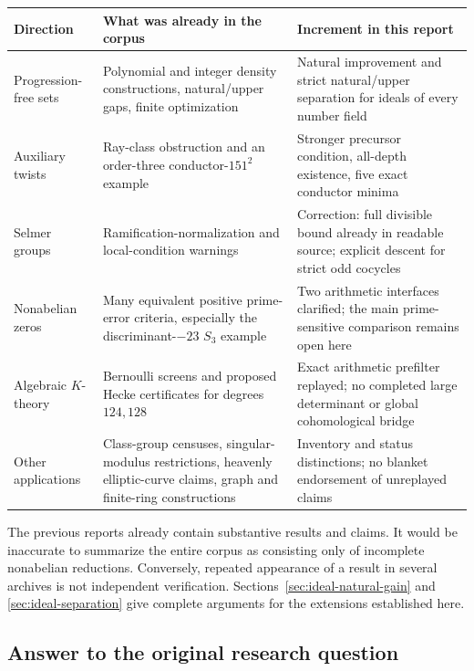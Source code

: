 \begin{center}\small
\begin{tabularx}{\textwidth}{@{}>{\raggedright\arraybackslash}p{}YY@{}}
\toprule
Direction & What was already in the corpus & Increment in this report\\
\midrule
Progression-free sets & Polynomial and integer density constructions,
natural/upper gaps, finite optimization & Natural improvement and
strict natural/upper separation for ideals of every number field\\
Auxiliary twists & Ray-class obstruction and an order-three
conductor-$151^2$ example & Stronger precursor condition, all-depth
existence, five exact conductor minima\\
Selmer groups & Ramification-normalization and local-condition warnings
& Correction: full divisible bound already in readable source;
explicit descent for strict odd cocycles\\
Nonabelian zeros & Many equivalent positive prime-error criteria,
especially the discriminant-$-23$ $S_3$ example & Two arithmetic
interfaces clarified; the main prime-sensitive comparison remains open here\\
Algebraic $K$-theory & Bernoulli screens and proposed Hecke certificates
for degrees $124,128$ & Exact arithmetic prefilter replayed; no completed
large determinant or global cohomological bridge\\
Other applications & Class-group censuses, singular-modulus restrictions,
heavenly elliptic-curve claims, graph and finite-ring constructions
& Inventory and status distinctions; no blanket endorsement of
unreplayed claims\\
\bottomrule
\end{tabularx}
\end{center}

The previous reports already contain substantive results and claims.
It would be inaccurate to summarize the entire corpus as consisting
only of incomplete nonabelian reductions. Conversely, repeated
appearance of a result in several archives is not independent
verification. Sections~\ref{sec:ideal-natural-gain} and
\ref{sec:ideal-separation} give complete arguments for the extensions
established here.

\subsection{Answer to the original research question}

